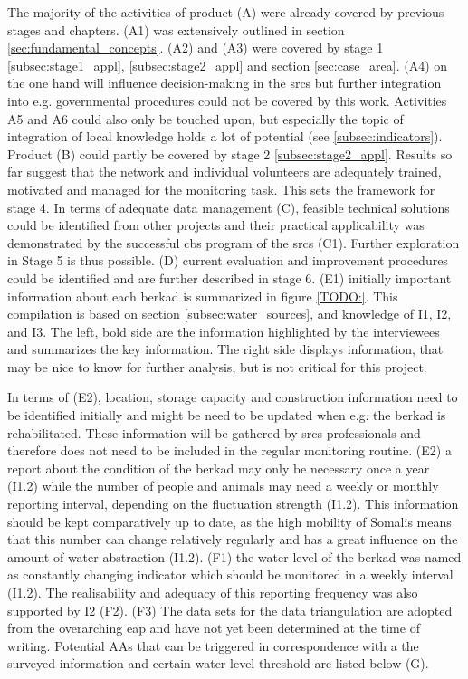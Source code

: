 The majority of the activities of product (A) were already covered by previous stages and chapters. (A1) was extensively outlined in section \ref*{sec:fundamental_concepts}. (A2) and (A3) were covered by stage 1 \ref*{subsec:stage1_appl}, \ref*{subsec:stage2_appl} and section \ref*{sec:case_area}. (A4) on the one hand will influence decision-making in the \acrshort{srcs} but further integration into e.g. governmental procedures could not be covered by this work. Activities A5 and A6 could also only be touched upon, but especially the topic of integration of local knowledge holds a lot of potential (see \ref*{subsec:indicators}).\newline
Product (B) could partly be covered by stage 2 \ref*{subsec:stage2_appl}. Results so far suggest that the network and individual volunteers are adequately trained, motivated and managed for the monitoring task. This sets the framework for stage 4. In terms of adequate data management (C), feasible technical solutions could be identified from other projects and their practical applicability was demonstrated by the successful \acrshort{cbs} program of the \acrshort{srcs} (C1). Further exploration in Stage 5 is thus possible. (D) current evaluation and improvement procedures could be identified and are further described in stage 6.\newline
(E1) initially important information about each berkad is summarized in figure \ref*{TODO:}. This compilation is based on section \ref*{subsec:water_sources}, and knowledge of I1, I2, and I3. The left, bold side are the information highlighted by the interviewees and summarizes the key information. The right side displays information, that may be nice to know for further analysis, but is not critical for this project.


In terms of (E2), location, storage capacity and construction information need to be identified initially and might be need to be updated when e.g. the berkad is rehabilitated. These information will be gathered by \acrshort{srcs} professionals and therefore does not need to be included in the regular monitoring routine. (E2) a report about the condition of the berkad may only be necessary once a year (I1.2) while the number of people and animals may need a weekly or monthly reporting interval, depending on the fluctuation strength (I1.2). This information should be kept comparatively up to date, as the high mobility of Somalis means that this number can change relatively regularly and has a great influence on the amount of water abstraction (I1.2).\newline
(F1) the water level of the berkad was named as constantly changing indicator which should be monitored in a weekly interval (I1.2). The realisability and adequacy of this reporting frequency was also supported by I2 (F2). (F3) The data sets for the data triangulation are adopted from the overarching \acrshort{eap} and have not yet been determined at the time of writing.\newline
Potential AAs that can be triggered in correspondence with a the surveyed information and certain water level threshold are listed below (G). 

